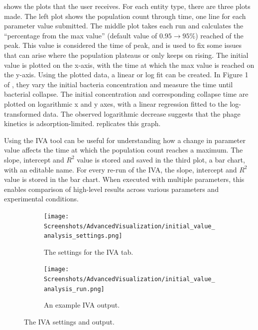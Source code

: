  shows the plots that the user receives.
For each entity type, there are three plots made.
The left plot shows the population count through time, one line for each parameter value submitted.
The middle plot takes each run and calculates the “percentage from the max value” (default value of $0.95 \rightarrow 95\%$) reached of the peak.
This value is considered the time of peak, and is used to fix some issues that can arise where the population plateaus or only keeps on rising.
The initial value is plotted on the x-axis, with the time at which the max value is reached on the y-axis.
Using the plotted data, a linear or log fit can be created.
In Figure 1 of \citet{mullaExtremeDiversityPhage2024}, they vary the initial bacteria concentration and measure the time until bacterial collapse. 
The initial concentration and corresponding collapse time are plotted on logarithmic x and y axes, with a linear regression fitted to the log-transformed data.
The observed logarithmic decrease suggests that the phage kinetics is adsorption-limited. 
 replicates this graph. 

Using the IVA tool can be useful for understanding how a change in parameter value affects the time at which the population count reaches a maximum.
The slope, intercept and $R^2$ value is stored and saved in the third plot, a bar chart, with an editable name. 
For every re-run of the IVA, the slope, intercept and $R^2$ value is stored in the bar chart. 
When executed with multiple parameters, this enables comparison of high-level results across various parameters and experimental conditions.

\begin{figure}[h!]
    \centering
    \begin{subfigure}{0.49\linewidth}
        \centering
        \captionsetup{width=1\linewidth}
        \texttt{[image: Screenshots/AdvancedVisualization/initial\_value\_analysis\_settings.png]}
        \caption{
            The settings for the IVA tab. 
        }
        \label{fig:ss:av:initial_value_analysis_settings}
        \vspace*{\fill}
    \end{subfigure}
    \hfill
    \begin{subfigure}{0.49\linewidth}
        \centering
        \captionsetup{width=1\linewidth}
        \texttt{[image: Screenshots/AdvancedVisualization/initial\_value\_analysis\_run.png]}
        \caption{
            An example IVA output. 
        }
        \label{fig:ss:av:initial_value_analysis_run}
        \vspace*{\fill}
    \end{subfigure}
    \caption{The IVA settings and output. }
\end{figure}

